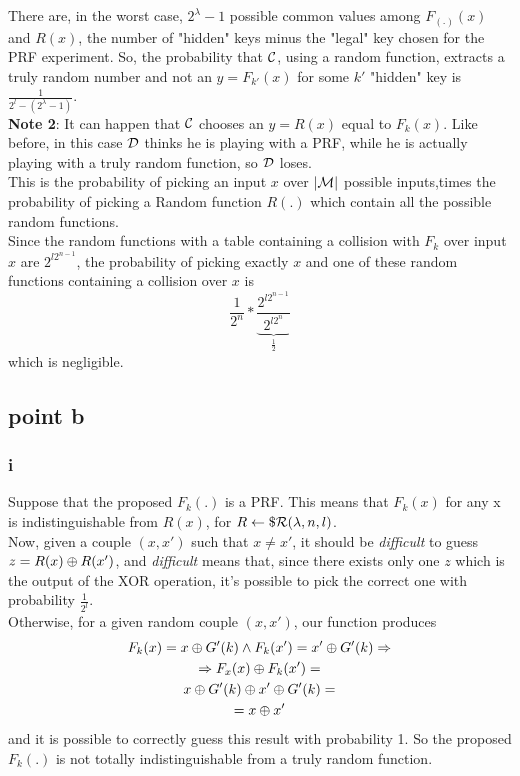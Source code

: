 \documentclass[11pt]{article}
\newcounter{t0d0_counter}
\begin{document}
There are, in the worst case, $2^{\lambda}-1$ possible common values among $F_{(.)}(x)$ and $R(x)$, the number of "hidden" keys minus the "legal" key chosen for the PRF experiment. So, the probability that $\mathcal{C}$, using a random function,  extracts a truly random number and not an $y=F_{k'}(x)$ for some $k'$ "hidden" key is $\frac{1}{2^{l}-(2^{\lambda}-1)}$.\\

\textbf{Note 2}: It can happen that $\mathcal{C}$ chooses an $y=R(x)$ equal to $F_{k}(x)$.
Like before, in this case $\mathcal{D}$ thinks he is playing with a PRF, while he is
actually playing with a truly random function, so $\mathcal{D}$ loses.\\

This is the probability of picking an input $x$ over $|\mathcal{M}|$ possible inputs,times the probability of picking a Random function $R(.)$ which contain all the possible random functions.\\
Since the random functions with a table containing a collision with $F_{k}$
over input $x$ are $ 2^{l 2^{n-1}} $, the probability of picking exactly $x$ and
one of these random functions containing a collision over $x$ is 
\[
    \frac{1}{2^{n}} * \underbrace{\frac{2^{l 2^{n-1}}}{2^{l
2^{n}}}}_{\frac{1}{2}}
\]
which is negligible.

\subsection{point b}
\subsubsection{i}

Suppose that the proposed $F_{k}(.)$ is a PRF. This means that $F_{k}(x)$ for
any x is indistinguishable from $R(x)$, for $R \leftarrow\$ \mathcal{R}(\lambda, n, l)$.\\
Now, given a couple $(x,x')$ such that $x \not= x'$, it should be
\textit{difficult}  to
guess $z=R(x) \oplus R(x')$, and \textit{difficult} means that, since there exists
only one $z$ which is the output of the XOR operation, it's possible to pick the
correct one with probability $\frac{1}{2^{l}}$.\\
Otherwise, for a given random couple $(x, x')$, our function produces
    \begin{gather*}
        F_{k}(x)=x \oplus G'(k) \wedge F_{k}(x')=x' \oplus G'(k) \Rightarrow\\
        \Rightarrow F_{x}(x) \oplus F_{k}(x') = \\
        x \oplus G'(k) \oplus x' \oplus G'(k) =\\
        =x \oplus x'
    \end{gather*}
and it is possible to correctly guess this result with probability 1. 
So the proposed $F_{k}(.)$ is not totally indistinguishable from a truly random
function.
\end{document}
